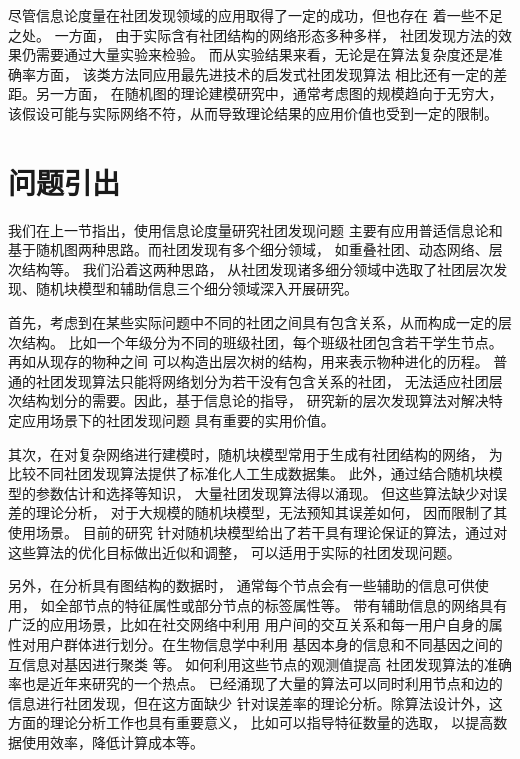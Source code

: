 尽管信息论度量在社团发现领域的应用取得了一定的成功，但也存在
着一些不足之处。
一方面，
由于实际含有社团结构的网络形态多种多样，
社团发现方法的效果仍需要通过大量实验来检验。
而从实验结果来看，无论是在算法复杂度还是准确率方面，
该类方法同应用最先进技术的启发式社团发现算法
相比还有一定的差距。另一方面，
在随机图的理论建模研究中，通常考虑图的规模趋向于无穷大，
该假设可能与实际网络不符，从而导致理论结果的应用价值也受到一定的限制。

\section{问题引出}
我们在上一节指出，使用信息论度量研究社团发现问题
主要有应用普适信息论和基于随机图两种思路。而社团发现有多个细分领域，
如重叠社团、动态网络、层次结构等。
我们沿着这两种思路，
从社团发现诸多细分领域中选取了社团层次发现、随机块模型和辅助信息三个细分领域深入开展研究。




首先，考虑到在某些实际问题中不同的社团之间具有包含关系，从而构成一定的层次结构。
比如一个年级分为不同的班级社团，每个班级社团包含若干学生节点。
再如从现存的物种之间
可以构造出层次树的结构，用来表示物种进化的历程。
普通的社团发现算法只能将网络划分为若干没有包含关系的社团，
无法适应社团层次结构划分的需要。因此，基于信息论的指导，
研究新的层次发现算法对解决特定应用场景下的社团发现问题
具有重要的实用价值。

其次，在对复杂网络进行建模时，随机块模型常用于生成有社团结构的网络，
为比较不同社团发现算法提供了标准化人工生成数据集。
此外，通过结合随机块模型的参数估计和选择等知识，
大量社团发现算法得以涌现。
但这些算法缺少对误差的理论分析，
对于大规模的随机块模型，无法预知其误差如何，
因而限制了其使用场景。
目前的研究
针对随机块模型给出了若干具有理论保证的算法，通过对这些算法的优化目标做出近似和调整，
可以适用于实际的社团发现问题。

另外，在分析具有图结构的数据时，
通常每个节点会有一些辅助的信息可供使用，
如全部节点的特征属性或部分节点的标签属性等。
带有辅助信息的网络具有广泛的应用场景，比如在社交网络中利用
用户间的交互关系和每一用户自身的属性对用户群体进行划分。在生物信息学中利用
基因本身的信息和不同基因之间的互信息对基因进行聚类 \cite{4359897}等。
如何利用这些节点的观测值提高
社团发现算法的准确率也是近年来研究的一个热点。
已经涌现了大量的算法可以同时利用节点和边的信息进行社团发现，但在这方面缺少
针对误差率的理论分析。除算法设计外，这方面的理论分析工作也具有重要意义，
比如可以指导特征数量的选取，
以提高数据使用效率，降低计算成本等。




